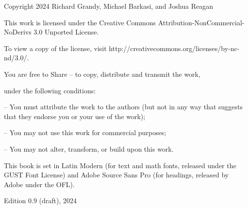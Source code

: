\documentclass[11pt,fleqn,twoside,openright]{report}%
\begin{document}
\setcounter{page}{1}%
\pagestyle{empty}

\vspace*{.8in}


\vspace{1.25in}

\vspace*{12pt}

\vspace*{12pt}

\vfill
\noindent{\LARGE{}\sffamily\selectfont{}{Draft 0.9}} %

\newpage
\pagestyle{empty}

\vspace*{.25in}
{\small 
\noindent{}Copyright \textcopyright{} 2024 Richard Grandy, Michael Barkasi, and Joshua Reagan

\bigskip
\noindent{}This work is licensed under the Creative Commons Attribution-NonCommercial-NoDerivs 3.0 Unported License. 

\noindent{}To view a copy of the license, visit http://creativecommons.org/licenses/by-nc-nd/3.0/.

\bigskip
\noindent{}You are free {to Share} -- to copy, distribute and transmit the work, 

\noindent{}under the following conditions: 

 -- You must attribute the work to the authors (but not in any way that suggests that they endorse you or your use of the work); 

 -- You may not use this work for commercial purposes;

 -- You may not alter, transform, or build upon this work.

\vfill
\noindent{}This book is set in Latin Modern (for text and math fonts, released under the GUST Font License) and Adobe Source Sans Pro (for headings, released by Adobe under the OFL). 

\bigskip
\noindent{}Edition 0.9 (draft), 2024
}
\end{document}
